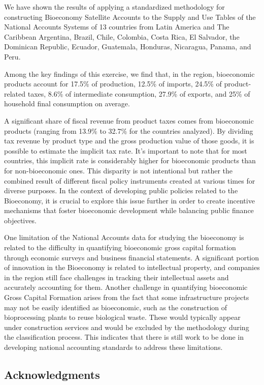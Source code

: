 \documentclass[
  letterpaper,
  DIV=11,
  numbers=noendperiod]{scrartcl}
\begin{document}
We have shown the results of applying a standardized methodology for
constructing Bioeconomy Satellite Accounts to the Supply and Use Tables
of the National Accounts Systems of 13 countries from Latin America and
The Caribbean Argentina, Brazil, Chile, Colombia, Costa Rica, El
Salvador, the Dominican Republic, Ecuador, Guatemala, Honduras,
Nicaragua, Panama, and Peru.

Among the key findings of this exercise, we find that, in the region,
bioeconomic products account for 17.5\% of production, 12.5\% of
imports, 24.5\% of product-related taxes, 8.6\% of intermediate
consumption, 27.9\% of exports, and 25\% of household final consumption
on average.

A significant share of fiscal revenue from product taxes comes from
bioeconomic products (ranging from 13.9\% to 32.7\% for the countries
analyzed). By dividing tax revenue by product type and the gross
production value of those goods, it is possible to estimate the implicit
tax rate. It's important to note that for most countries, this implicit
rate is considerably higher for bioeconomic products than for
non-bioeconomic ones. This disparity is not intentional but rather the
combined result of different fiscal policy instruments created at
various times for diverse purposes. In the context of developing public
policies related to the Bioeconomy, it is crucial to explore this issue
further in order to create incentive mechanisms that foster bioeconomic
development while balancing public finance objectives.

One limitation of the National Accounts data for studying the bioeconomy
is related to the difficulty in quantifying bioeconomic gross capital
formation through economic surveys and business financial statements. A
significant portion of innovation in the Bioeconomy is related to
intellectual property, and companies in the region still face challenges
in tracking their intellectual assets and accurately accounting for
them. Another challenge in quantifying bioeconomic Gross Capital
Formation arises from the fact that some infrastructure projects may not
be easily identified as bioeconomic, such as the construction of
bioprocessing plants to reuse biological waste. These would typically
appear under construction services and would be excluded by the
methodology during the classification process. This indicates that there
is still work to be done in developing national accounting standards to
address these limitations.

\subsection{Acknowledgments}\label{acknowledgments}
\end{document}
